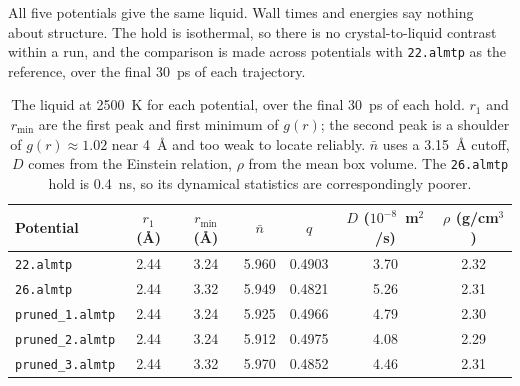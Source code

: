 \documentclass{article}
\begin{document}
All five potentials give the same liquid. Wall times and energies say nothing about structure. The hold is isothermal, so there is no crystal-to-liquid contrast within a run, and the comparison is made across potentials with \texttt{22.almtp} as the reference, over the final 30~ps of each trajectory.

\begin{table}[H]
\centering
\small
\begin{tabular}{l|c|c|c|c|c|c}
\toprule
Potential & $r_1$ (\AA) & $r_{\min}$ (\AA) & $\bar{n}$ & $q$ & $D$ ($10^{-8}$~m$^2$/s) & $\rho$ (g/cm$^3$) \\
\midrule
\texttt{22.almtp}        & 2.44 & 3.24 & 5.960 & 0.4903 & 3.70 & 2.32 \\
\texttt{26.almtp}        & 2.44 & 3.32 & 5.949 & 0.4821 & 5.26 & 2.31 \\
\texttt{pruned\_1.almtp} & 2.44 & 3.24 & 5.925 & 0.4966 & 4.79 & 2.30 \\
\texttt{pruned\_2.almtp} & 2.44 & 3.24 & 5.912 & 0.4975 & 4.08 & 2.29 \\
\texttt{pruned\_3.almtp} & 2.44 & 3.32 & 5.970 & 0.4852 & 4.46 & 2.31 \\
\bottomrule
\end{tabular}
\caption{The liquid at 2500~K for each potential, over the final 30~ps of each hold. $r_1$ and $r_{\min}$ are the first peak and first minimum of $g(r)$; the second peak is a shoulder of $g(r) \approx 1.02$ near 4~\AA{} and too weak to locate reliably. $\bar{n}$ uses a 3.15~\AA{} cutoff, $D$ comes from the Einstein relation, $\rho$ from the mean box volume. The \texttt{26.almtp} hold is 0.4~ns, so its dynamical statistics are correspondingly poorer.}
\label{tab:hold_structural}
\end{table}
\end{document}
